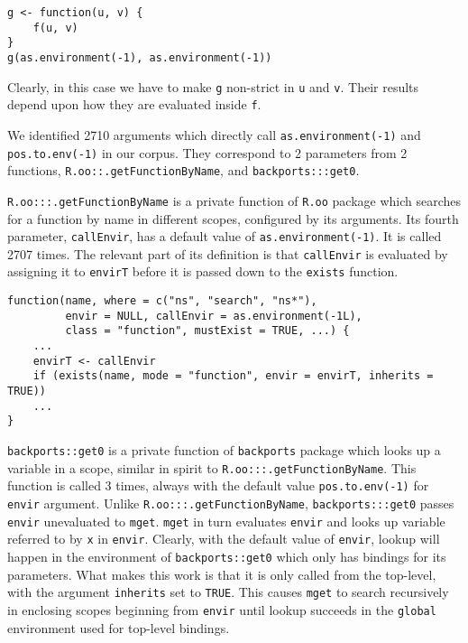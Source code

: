 \documentclass[review,nonacm,screen,acmsmall,anonymous=true]{acmart}
\newcommand{\code}[1]{\lstinline |#1|\xspace}
\begin{document}
\begin{lstlisting}
g <- function(u, v) {
    f(u, v)
}
g(as.environment(-1), as.environment(-1))
\end{lstlisting}

Clearly, in this case we have to make \code{g} non-strict in \code{u} and
\code{v}. Their results depend upon how they are evaluated inside \code{f}.

We identified 2710 arguments which directly call \code{as.environment(-1)} and
\code{pos.to.env(-1)} in our corpus. They correspond to 2 parameters from 2
functions, \code{R.oo::.getFunctionByName}, and \code{backports:::get0}.

\code{R.oo:::.getFunctionByName} is a private function of \code{R.oo} package
which searches for a function by name in different scopes, configured by its
arguments. Its fourth parameter, \code{callEnvir}, has a default value of
\code{as.environment(-1)}. It is called 2707 times. The relevant part of its
definition is that \code{callEnvir} is evaluated by assigning it to
\code{envirT} before it is passed down to the \code{exists} function.

\begin{lstlisting}
function(name, where = c("ns", "search", "ns*"),
         envir = NULL, callEnvir = as.environment(-1L),
         class = "function", mustExist = TRUE, ...) {
    ...
    envirT <- callEnvir
    if (exists(name, mode = "function", envir = envirT, inherits = TRUE))
    ...
}
\end{lstlisting}

\code{backports::get0} is a private function of \code{backports} package which
looks up a variable in a scope, similar in spirit to
\code{R.oo:::.getFunctionByName}. This function is called 3 times, always with
the default value \code{pos.to.env(-1)} for \code{envir} argument. Unlike
\code{R.oo:::.getFunctionByName}, \code{backports:::get0} passes \code{envir}
unevaluated to \code{mget}. \code{mget} in turn evaluates \code{envir} and looks
up variable referred to by \code{x} in \code{envir}. Clearly, with the default
value of \code{envir}, lookup will happen in the environment of
\code{backports::get0} which only has bindings for its parameters. What makes
this work is that it is only called from the top-level, with the argument
\code{inherits} set to \code{TRUE}. This causes \code{mget} to search
recursively in enclosing scopes beginning from \code{envir} until lookup
succeeds in the \code{global} environment used for top-level bindings.
\end{document}

